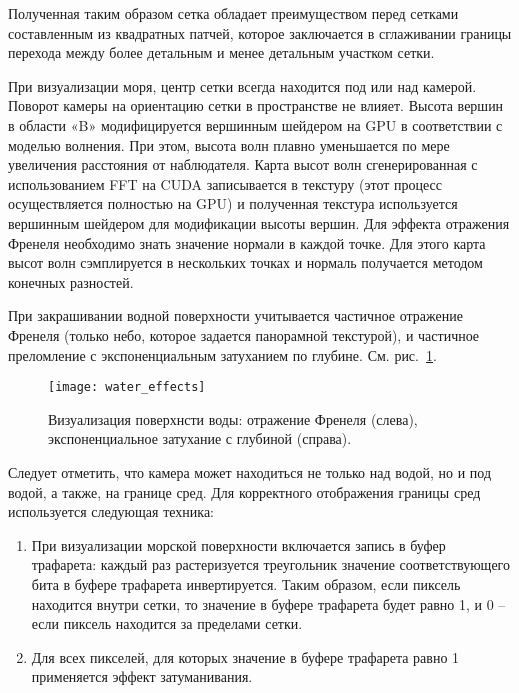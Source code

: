 Полученная таким образом сетка обладает преимуществом перед сетками составленным из квадратных патчей, которое заключается в сглаживании границы перехода между более детальным и менее детальным участком сетки.

При визуализации моря, центр сетки всегда находится под или над камерой. Поворот камеры на ориентацию сетки в пространстве не влияет. Высота вершин в области «B» модифицируется вершинным шейдером на GPU в соответствии с моделью волнения. При этом, высота волн плавно уменьшается по мере увеличения расстояния от наблюдателя. Карта высот волн сгенерированная с использованием FFT на CUDA записывается в текстуру (этот процесс осуществляется полностью на GPU) и полученная текстура используется вершинным шейдером для модификации высоты вершин. Для эффекта отражения Френеля необходимо знать значение нормали в каждой точке. Для этого карта высот волн сэмплируется в нескольких точках и нормаль получается методом конечных разностей.



При закрашивании водной поверхности учитывается частичное отражение Френеля (только небо, которое задается панорамной текстурой), 
и частичное преломление с экспоненциальным затуханием по глубине. См. рис.~\ref{water_effects}.

\begin{figure}[ht]
\begin{center}
\texttt{[image: water\_effects]}
\end{center}
\caption{Визуализация поверхнсти воды: отражение Френеля (слева), экспоненциальное затухание с глубиной (справа).}
\label{water_effects}
\end{figure}



Следует отметить, что камера может находиться не только над водой, но и под водой, а также, на границе сред. Для корректного отображения границы сред используется следующая техника:
\begin{enumerate}
\item	При визуализации морской поверхности включается запись в буфер трафарета: каждый раз растеризуется треугольник значение соответствующего бита в буфере трафарета инвертируется. Таким образом, если пиксель находится внутри сетки, то значение в буфере трафарета будет равно 1, и 0 – если пиксель находится за пределами сетки.
\item	Для всех пикселей, для которых значение в буфере трафарета равно 1 применяется эффект затуманивания.
\end{enumerate}

